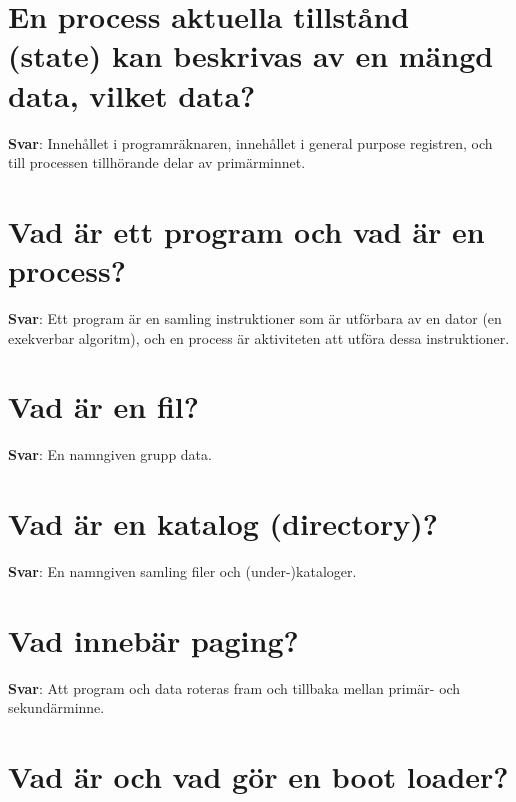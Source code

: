 \documentclass[a4paper,11pt,oneside]{book}
\begin{document}
\begin{sloppypar}
\section{En process aktuella tillst\r{a}nd (state) kan beskrivas av en m\"angd data, vilket data?}

\label{q:120:sa:sv:True}

\textbf{Svar}: Inneh\r{a}llet i programr\"aknaren, inneh\r{a}llet i general purpose registren, och till processen tillh\"orande delar av prim\"arminnet.



\section{Vad \"ar ett program och vad \"ar en process?}

\label{q:121:sa:sv:True}

\textbf{Svar}: Ett program \"ar en samling instruktioner som \"ar utf\"orbara av en dator (en exekverbar algoritm), och en process \"ar aktiviteten att utf\"ora dessa instruktioner.



\section{Vad \"ar en fil?}

\label{q:122:sa:sv:True}

\textbf{Svar}: En namngiven grupp data.



\section{Vad \"ar en katalog (directory)?}

\label{q:123:sa:sv:True}

\textbf{Svar}: En namngiven samling filer och (under-)kataloger.



\section{Vad inneb\"ar paging?}

\label{q:124:sa:sv:True}

\textbf{Svar}: Att program och data roteras fram och tillbaka mellan prim\"ar- och sekund\"arminne.



\section{Vad \"ar och vad g\"or en boot loader?}


\end{sloppypar}
\end{document}
